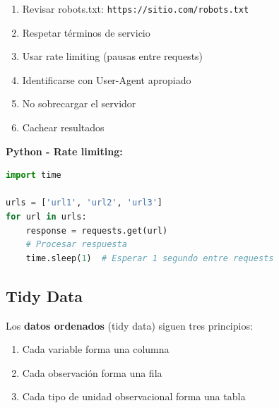 \documentclass[a4paper,11pt]{article}
\begin{document}
\begin{tcolorbox}[colback=advertenciacolor!20, colframe=red, title=Mejores prácticas de web scraping]
\begin{enumerate}
    \item Revisar robots.txt: \texttt{https://sitio.com/robots.txt}
    \item Respetar términos de servicio
    \item Usar rate limiting (pausas entre requests)
    \item Identificarse con User-Agent apropiado
    \item No sobrecargar el servidor
    \item Cachear resultados
\end{enumerate}
\end{tcolorbox}

\textbf{Python - Rate limiting:}
\begin{lstlisting}[language=Python]
import time

urls = ['url1', 'url2', 'url3']
for url in urls:
    response = requests.get(url)
    # Procesar respuesta
    time.sleep(1)  # Esperar 1 segundo entre requests
\end{lstlisting}

\subsection{Tidy Data}

Los \textbf{datos ordenados} (tidy data) siguen tres principios:

\begin{enumerate}
    \item Cada variable forma una columna
    \item Cada observación forma una fila
    \item Cada tipo de unidad observacional forma una tabla
\end{enumerate}
\end{document}
